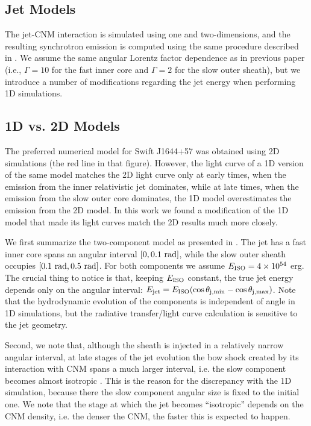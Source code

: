 \documentclass[usenatbib,fleqn]{mnras}
\begin{document}
\subsection{Jet Models}
\label{sec:numerical}

The jet-CNM interaction is simulated using one and two-dimensions, and
the resulting synchrotron emission is computed using the same
procedure described in \citet{Mimica+2015}. We assume the same angular
Lorentz factor dependence as in previous paper (i.e., $\Gamma = 10$
for the fast inner core and $\Gamma = 2$ for the slow outer sheath),
but we introduce a number of modifications regarding the jet energy
when performing 1D simulations.

\subsection{1D vs. 2D Models}
\label{sec:2D}

The preferred numerical model for Swift J1644+57 \citep[Fig.10
in][]{Mimica+2015} was obtained using 2D simulations (the red line in
that figure). However, the light curve of a 1D version of the same
model \citep[black line in Fig. 10 in][see also section 4.2 of that
paper]{Mimica+2015} matches the 2D light curve only at early times,
when the emission from the inner relativistic jet dominates, while at
late times, when the emission from the slow outer core dominates, the
1D model overestimates the emission from the 2D model. In this work we
found a modification of the 1D model that made its light curves
match the 2D results much more closely.

We first summarize the two-component model as presented in
\citet{Mimica+2015}. The jet has a fast inner core spans an
angular interval $[0, 0.1\ {\rm rad}]$, while the slow outer sheath
occupies $[0.1\ {\rm rad}, 0.5\ {\rm rad}]$. For both components we
assume $E_{\rm ISO} = 4\times 10^{54}$ erg. The crucial thing to
notice is that, keeping $E_{\rm ISO}$ constant, the true jet energy
depends only on the angular interval: $E_{\rm jet} = E_{\rm ISO}
(\cos\theta_{\rm j,min} - \cos\theta_{\rm j,max})$. Note that the
hydrodynamic evolution of the components is independent of angle in 1D
simulations, but the radiative transfer/light curve calculation is
sensitive to the jet geometry.

Second, we note that, although the sheath is injected in a relatively
narrow angular interval, at late stages of the jet evolution the bow
shock created by its interaction with CNM spans a much larger interval,
i.e. the slow component becomes almost isotropic \citep[bottom two
panels in Fig. 8 in][]{Mimica+2015}. This is the reason for the
discrepancy with the 1D simulation, because there the slow component
angular size is fixed to the initial one. We note that the stage at
which the jet becomes ``isotropic'' depends on the CNM density,
i.e. the denser the CNM, the faster this is expected to happen.
\end{document}
